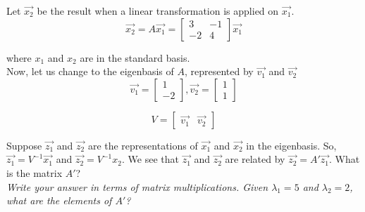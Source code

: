 \begin{enumerate}
\qitem Let $\vec{x_2}$ be the result when a linear transformation is applied on $\vec{x_1}$.
$$\vec{x_2} = A \vec{x_1} =
\begin{bmatrix}
3 & -1 \\
-2 & 4
\end{bmatrix}
\vec{x_1}
$$

where $x_1$ and $x_2$ are in the standard basis. \\
Now, let us change to the eigenbasis of $A$, represented by $\vec{v_1}$ and $\vec{v_2}$
$$
\vec{v_1} =
\begin{bmatrix}
1 \\
-2
\end{bmatrix},
\vec{v_2} =
\begin{bmatrix}
1 \\
1
\end{bmatrix}
$$

$$ V =
\begin{bmatrix}
\vec{v_1} & \vec{v_2}
\end{bmatrix}
$$

Suppose $\vec{z_1}$ and $\vec{z_2}$ are the representations of $\vec{x_1}$ and $\vec{x_2}$ in the eigenbasis.
So, $\vec{z_1} = V^{-1}\vec{x_1}$ and $\vec{z_2} = V^{-1}x_2$.
We see that $\vec{z_1}$ and $\vec{z_2}$ are related by $\vec{z_2} = A'\vec{z_1}$.
What is the matrix $A'$? \\
\textit{
Write your answer in terms of matrix multiplications.
Given $\lambda_1 = 5$ and $\lambda_2 = 2$, what are the elements of $A'$?
} \\


\end{enumerate}
